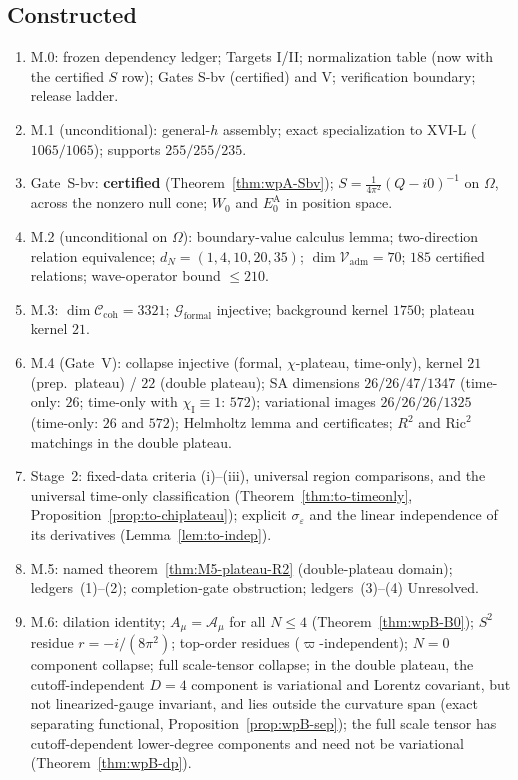 \documentclass{article}
\theoremstyle{remark}
\newcommand{\sigeps}{\sigma_\varepsilon}
\newcommand{\chiI}{\chi_{\mathrm I}}
\newcommand{\Ccoh}{\mathcal C_{\mathrm{coh}}}
\begin{document}
\subsection{Constructed}
\begin{enumerate}
\item M.0: frozen dependency ledger; Targets I/II; normalization table (now with the certified $S$ row); Gates S-bv (certified) and V; verification boundary; release ladder.
\item M.1 (unconditional): general-$h$ assembly; exact specialization to XVI-L ($1065/1065$); supports $255/255/235$.
\item Gate~S-bv: \textbf{certified} (Theorem~\ref{thm:wpA-Sbv}); $S=\frac1{4\pi^2}(Q-i0)^{-1}$ on $\Omega$, across the nonzero null cone; $W_0$ and $E_0^{\mathrm A}$ in position space.
\item M.2 (unconditional on $\Omega$): boundary-value calculus lemma; two-direction relation equivalence; $d_N=(1,4,10,20,35)$; $\dim\mathcal V_{\mathrm{adm}}=70$; $185$ certified relations; wave-operator bound $\le210$.
\item M.3: $\dim\Ccoh=3321$; $\mathcal G_{\mathrm{formal}}$ injective; background kernel $1750$; plateau kernel $21$.
\item M.4 (Gate~V): collapse injective (formal, $\chi$-plateau, time-only), kernel $21$ (prep.\ plateau) / $22$ (double plateau); SA dimensions $26/26/47/1347$ (time-only: $26$; time-only with $\chiI\equiv1$: $572$); variational images $26/26/26/1325$ (time-only: $26$ and $572$); Helmholtz lemma and certificates; $R^2$ and $\mathrm{Ric}^2$ matchings in the double plateau.
\item Stage~2: fixed-data criteria (i)--(iii), universal region comparisons, and the universal time-only classification (Theorem~\ref{thm:to-timeonly}, Proposition~\ref{prop:to-chiplateau}); explicit $\sigeps$ and the linear independence of its derivatives (Lemma~\ref{lem:to-indep}).
\item M.5: named theorem~\ref{thm:M5-plateau-R2} (double-plateau domain); ledgers~(1)--(2); completion-gate obstruction; ledgers~(3)--(4) Unresolved.
\item M.6: dilation identity; $A_\mu=\mathcal A_\mu$ for all $N\le4$ (Theorem~\ref{thm:wpB-B0}); $S^2$ residue $r=-i/(8\pi^2)$; top-order residues ($\varpi$-independent); $N=0$ component collapse; full scale-tensor collapse; in the double plateau, the cutoff-independent $D=4$ component is variational and Lorentz covariant, but not linearized-gauge invariant, and lies outside the curvature span (exact separating functional, Proposition~\ref{prop:wpB-sep}); the full scale tensor has cutoff-dependent lower-degree components and need not be variational (Theorem~\ref{thm:wpB-dp}).

\end{enumerate}
\end{document}
